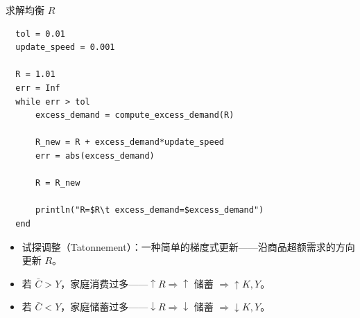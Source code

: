 \documentclass[10pt,aspectratio=169]{beamer}
\begin{document}
\begin{frame}[fragile]{求解均衡 $R$}
  \begin{lstlisting}
  tol = 0.01
  update_speed = 0.001

  R = 1.01
  err = Inf
  while err > tol
      excess_demand = compute_excess_demand(R)

      R_new = R + excess_demand*update_speed
      err = abs(excess_demand)

      R = R_new

      println("R=$R\t excess_demand=$excess_demand")
  end
  \end{lstlisting}

  \begin{itemize}
    \item 试探调整（Tatonnement）：一种简单的梯度式更新——沿商品超额需求的方向更新 $R$。
    \item 若 $\bar C > Y$，家庭消费过多——$\uparrow R\Rightarrow \uparrow$ 储蓄 $\Rightarrow \uparrow K, Y$。
    \item 若 $\bar C < Y$，家庭储蓄过多——$\downarrow R\Rightarrow \downarrow$ 储蓄 $\Rightarrow \downarrow K, Y$。
  \end{itemize}
\end{frame}
\end{document}
